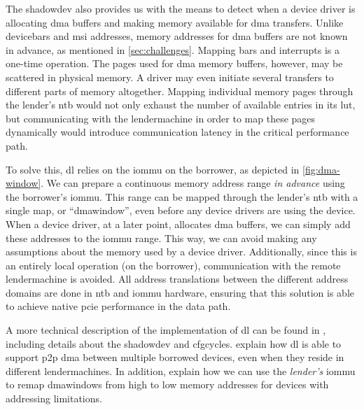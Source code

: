 The \gls{shadowdev} also provides us with the means to detect when a device driver is allocating \gls{dma} buffers and making memory available for \gls{dma} transfers.
%
Unlike \glspl{devicebar} and \gls{msi} addresses, memory addresses for \gls{dma} buffers are not known in advance, as mentioned in \cref{sec:challenges}.
%
Mapping \glspl{bar} and interrupts is a one-time operation.
%
The pages used for \gls{dma} memory buffers, however, may be scattered in physical memory.
%
A driver may even initiate several transfers to different parts of memory altogether.
%
Mapping individual memory pages through the \gls{lender}'s \gls{ntb} would not only exhaust the number of available entries in its \gls{lut}, but communicating with the \gls{lendermachine} in order to map these pages dynamically would introduce communication latency in the critical performance path.



To solve this, \gls{dl} relies on the \gls{iommu} on the \gls{borrower}, as depicted in \cref{fig:dma-window}.
%
We can prepare a continuous memory address range \emph{in advance} using the \gls{borrower}'s \gls{iommu}.
%
This range can be mapped through the \gls{lender}'s \gls{ntb} with a single map, or ``\gls{dmawindow}'', even before any device drivers are using the device.
%
When a device driver, at a later point, allocates \gls{dma} buffers, we can simply add these addresses to the \gls{iommu} range.
%
This way, we can avoid making any assumptions about the memory used by a device driver.
%
Additionally, since this is an entirely local operation (on the \gls{borrower}), communication with the remote \gls{lendermachine} is avoided.
%
All address translations between the different address domains are done in \gls{ntb} and \gls{iommu} hardware, ensuring that this solution is able to achieve native \gls{pcie} performance in the data path.



A more technical description of the implementation of \gls{dl} can be found in , including details about the \gls{shadowdev} and \glspl{cfgcycle}.
%
 explain how \gls{dl} is able to support \gls{p2p} \gls{dma} between multiple borrowed devices, even when they reside in different \glspl{lendermachine}.
%
In addition,  explain how we can use the \emph{\gls{lender}'s} \gls{iommu} to remap \glspl{dmawindow} from high to low memory addresses for devices with addressing limitations.



